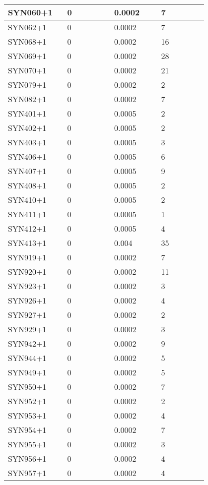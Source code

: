 \begin{longtable}[H]{|p{0.2\linewidth}|p{0.2\linewidth}|p{0.2\linewidth}|p{0.2\linewidth}|}
\hline
SYN060+1 &  0 &  0.0002 &  7 \\
\hline
SYN062+1 &  0 &  0.0002 &  7 \\
\hline
SYN068+1 &  0 &  0.0002 &  16 \\
\hline
SYN069+1 &  0 &  0.0002 &  28 \\
\hline
SYN070+1 &  0 &  0.0002 &  21 \\
\hline
SYN079+1 &  0 &  0.0002 &  2 \\
\hline
SYN082+1 &  0 &  0.0002 &  7 \\
\hline
SYN401+1 &  0 &  0.0005 &  2 \\
\hline
SYN402+1 &  0 &  0.0005 &  2 \\
\hline
SYN403+1 &  0 &  0.0005 &  3 \\
\hline
SYN406+1 &  0 &  0.0005 &  6 \\
\hline
SYN407+1 &  0 &  0.0005 &  9 \\
\hline
SYN408+1 &  0 &  0.0005 &  2 \\
\hline
SYN410+1 &  0 &  0.0005 &  2 \\
\hline
SYN411+1 &  0 &  0.0005 &  1 \\
\hline
SYN412+1 &  0 &  0.0005 &  4 \\
\hline
SYN413+1 &  0 &  0.004 &  35 \\
\hline
SYN919+1 &  0 &  0.0002 &  7 \\
\hline
SYN920+1 &  0 &  0.0002 &  11 \\
\hline
SYN923+1 &  0 &  0.0002 &  3 \\
\hline
SYN926+1 &  0 &  0.0002 &  4 \\
\hline
SYN927+1 &  0 &  0.0002 &  2 \\
\hline
SYN929+1 &  0 &  0.0002 &  3 \\
\hline
SYN942+1 &  0 &  0.0002 &  9 \\
\hline
SYN944+1 &  0 &  0.0002 &  5 \\
\hline
SYN949+1 &  0 &  0.0002 &  5 \\
\hline
SYN950+1 &  0 &  0.0002 &  7 \\
\hline
SYN952+1 &  0 &  0.0002 &  2 \\
\hline
SYN953+1 &  0 &  0.0002 &  4 \\
\hline
SYN954+1 &  0 &  0.0002 &  7 \\
\hline
SYN955+1 &  0 &  0.0002 &  3 \\
\hline
SYN956+1 &  0 &  0.0002 &  4 \\
\hline
SYN957+1 &  0 &  0.0002 &  4 \\

\end{longtable}
